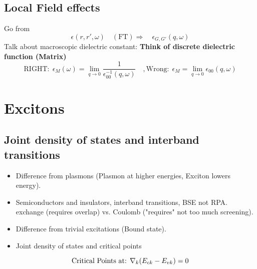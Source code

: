 \documentclass{article}
\begin{document}
\subsection{Local Field effects}
Go from
\begin{equation}
    \epsilon(r,r',\omega) \quad (\mathrm{FT})\Rightarrow \quad \epsilon_{G,G'}(q,\omega)
\end{equation}
Talk about macroscopic dielectric constant: \textbf{Think of discrete dielectric function (Matrix)}
\begin{equation}
    \mathrm{RIGHT:} \;\epsilon_{M}(\omega) = \lim_{q\rightarrow 0}\dfrac{1}{\epsilon^{-1}_{00}(q,\omega)} \quad ,\mathrm{Wrong:} \; \epsilon_{M} = \lim_{q\rightarrow0}\epsilon_{00}(q,\omega)
\end{equation}

\newpage
\section{Excitons}
\subsection{Joint density of states and interband transitions}
\begin{itemize}
    \item Difference from plasmons (Plasmon at higher energies, Exciton lowers energy).
    \item Semiconductors and insulators, interband transitions, BSE not RPA. exchange (requires overlap) vs. Coulomb ("requires" not too much screening).
    \item Difference from trivial excitations (Bound state).
    \item Joint density of states and critical points
\end{itemize}
  

\begin{equation}
    \text{Critical Points at: } \nabla_k \qty(E_{ck} - E_{vk}) = 0
\end{equation}
\end{document}
